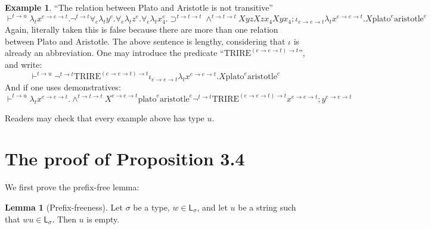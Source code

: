 \documentclass[11pt,a4paper]{article}
\theoremstyle{definition}
\newtheorem{example}[definition]{Example}
\newtheorem{lemma}[definition]{Lemma}
\theoremstyle{plain}
\newcommand{\Lang}{\mathsf{L}}
\begin{document}
\begin{example}
  ``The relation between Plato and Aristotle is not transitive''
  \[ \vdash^{t\to u}
\lambda_t x^{e\to e\to t}. \lnot^{t\to t}
\forall_e \lambda_t y^{e}. \forall_e \lambda_t z^{e}. \forall_e \lambda_t x_4^{e}. 
\supset^{t\to t\to t} \land^{t\to t\to t} X y z X z x_4 X y x_4 ; 
\iota_{e\to e\to t} \lambda_t x^{e\to e\to t}. X\text{plato}^{e}\text{aristotle}^{e} \]
Again, literally taken this is false because there are more than one relation between Plato and Aristotle. The above sentence is lengthy, considering that $\iota$ is already an abbreviation. One may introduce the predicate ``$\text{TRIRE}^{(e\to e\to t) \to t}$'', and write:
\[\vdash^{t\to u} \lnot^{t\to t} \text{TRIRE}^{(e\to e\to t)\to t}
\iota_{e\to e\to t} \lambda_t x^{e\to e\to t}. X\text{plato}^{e}\text{aristotle}^{e} \]
And if one uses demonstratives:
\[ \vdash^{t\to u} \lambda_tx^{e\to e\to t}. \land^{t\to t\to t} X^{e\to e\to t}\text{plato}^{e}\text{aristotle}^{e} \lnot^{t\to t} \text{TRIRE}^{(e\to e\to t)\to t}x^{e\to e\to t};y^{e\to e\to t}
\]
\end{example}
Readers may check that every example above has type $u$.

\appendix
\section{The proof of Proposition 3.4}

We first prove the prefix-free lemma:

\begin{lemma}[Prefix-freeness]\label{lem:prefix}
Let $\sigma$ be a type, $w\in\Lang_\sigma$, and let $u$ be a string
such that $wu\in\Lang_\sigma$. Then $u$ is empty.
\end{lemma}
\end{document}
